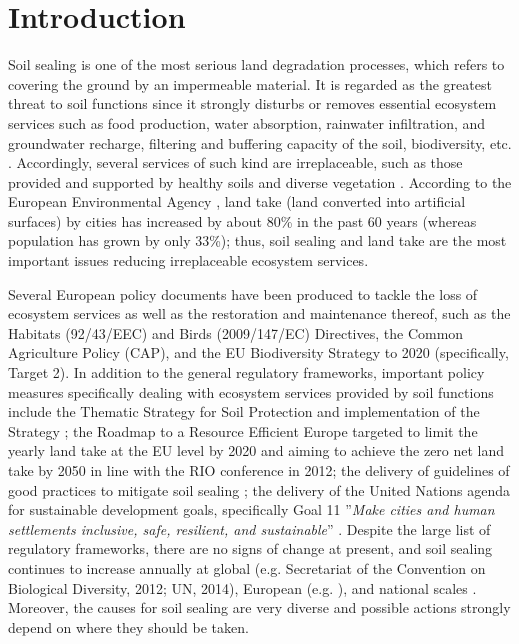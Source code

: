 \documentclass[APA,LATO1COL,doublespace]{WileyNJD-v2}
\begin{document}

\section{Introduction}\label{sec1}
Soil sealing is one of the most serious land degradation processes, which refers to covering the ground by an impermeable material.
It is regarded as the greatest threat to soil functions since it strongly disturbs or removes essential ecosystem services such as food production, water absorption, rainwater infiltration, and groundwater recharge, filtering and buffering capacity of the soil, biodiversity, etc. \citep{FAO15}.
Accordingly, several services of such kind are irreplaceable, such as those provided and supported by healthy soils and diverse vegetation \citep{Dunbar13}.
According to the European Environmental Agency \citep{EEA2011}, land take (land converted into artificial surfaces) by cities has increased by about 80\% in the past 60 years (whereas population has grown by only 33\%); thus, soil sealing and land take are the most important issues reducing irreplaceable ecosystem services.

Several European policy documents have been produced to tackle the loss of ecosystem services as well as the restoration and maintenance thereof, such as the Habitats (92/43/EEC) and Birds (2009/147/EC) Directives, the Common Agriculture Policy (CAP), and the EU Biodiversity Strategy to 2020 (specifically, Target 2).
In addition to the general regulatory frameworks, important policy measures specifically dealing with ecosystem services provided by soil functions include the Thematic Strategy for Soil Protection \citep{EC2006} and implementation of the Strategy \citep{EC2012}; the Roadmap to a Resource Efficient Europe \citep{EC2011a} targeted to limit the yearly land take at the EU level by 2020 and aiming to achieve the zero net land take by 2050 in line with the RIO conference in 2012; the delivery of guidelines of good practices to mitigate soil sealing \citep{SWD12}; the delivery of the United Nations agenda \citep{UN15} for sustainable development goals, specifically Goal 11 ''\textit{Make cities and human settlements inclusive, safe, resilient, and sustainable}'' \citep{Keesstra16}.
Despite the large list of regulatory frameworks, there are no signs of change at present, and soil sealing continues to increase annually \citep{FAO15} at global (e.g. Secretariat of the Convention on Biological Diversity, 2012; UN, 2014), European (e.g. \citealp{SWD12}), and national scales \citep[e.g.][Copernicus Land Monitoring Service\footnote{ http://land.copernicus.eu}]{ISPRA16,ISPRA18}.
Moreover, the causes for soil sealing are very diverse and possible actions strongly depend on where they should be taken.
\end{document}
